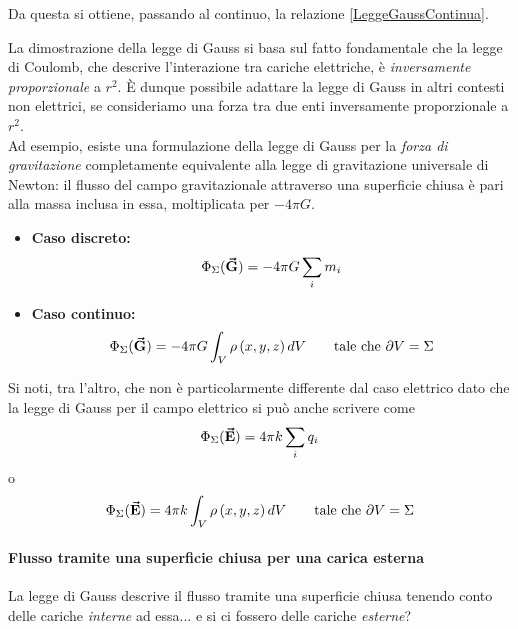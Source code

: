 Da questa si ottiene, passando al continuo, la relazione \ref{LeggeGaussContinua}.
\begin{observe}\label{LeggeGaussMoltoGeneralizzata}
	La dimostrazione della legge di Gauss si basa sul fatto fondamentale che la legge di Coulomb, che descrive l'interazione tra cariche elettriche, è \textit{inversamente proporzionale} a $r^2$. È dunque possibile adattare la legge di Gauss in altri contesti non elettrici, se consideriamo una forza tra due enti inversamente proporzionale a $r^2$.\\
	Ad esempio, esiste una formulazione della legge di Gauss per la \textit{forza di gravitazione} completamente equivalente alla legge di gravitazione universale di Newton: il flusso del campo gravitazionale attraverso una superficie chiusa è pari alla massa inclusa in essa, moltiplicata per $-4\pi G$.
	\begin{itemize}
		\item \textbf{Caso discreto:}
		\begin{equation}
			\Phi_\Sigma(\vb*{\va{G}})=-4\pi G\sum_i m_i
		\end{equation}
		\item \textbf{Caso continuo:}
		\begin{equation}
			\Phi_\Sigma(\vb*{\va{G}})=-4\pi G\int_{V}\rho\left(x,y,z\right)dV\qquad\text{tale che}\ \partial V=\Sigma
		\end{equation}
	\end{itemize}
	Si noti, tra l'altro, che non è particolarmente differente dal caso elettrico dato che la legge di Gauss per il campo elettrico si può anche scrivere come \begin{equation*}
		\Phi_\Sigma(\vb*{\va{E}})=4\pi k\sum_i q_i
	\end{equation*}
	o
	\begin{equation}
		\Phi_\Sigma(\vb*{\va{E}})=4\pi k\int_{V}\rho\left(x,y,z\right)dV\qquad\text{tale che}\ \partial V=\Sigma
	\end{equation}
\end{observe}
\paragraph{Flusso tramite una superficie chiusa per una carica esterna}
La legge di Gauss descrive il flusso tramite una superficie chiusa tenendo conto delle cariche \textit{interne} ad essa... e si ci fossero delle cariche \textit{esterne}?

